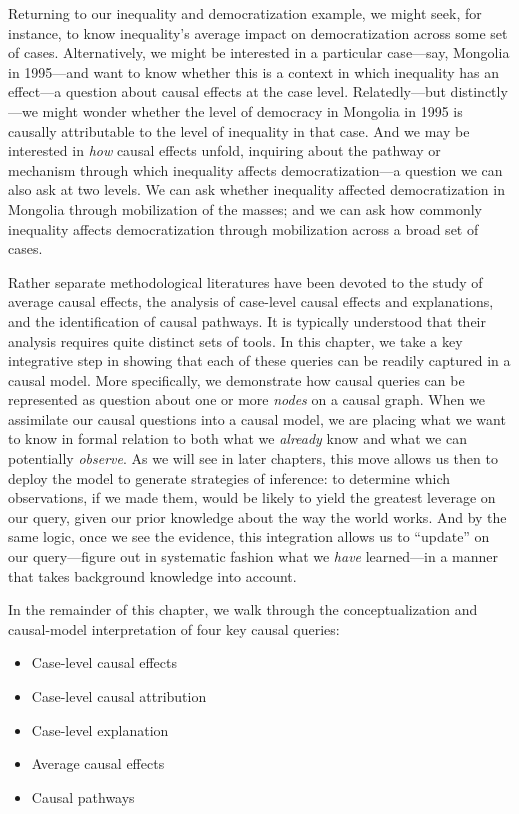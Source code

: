 \documentclass[12pt,]{book}
\begin{document}
Returning to our inequality and democratization example, we might seek, for instance, to know inequality's average impact on democratization across some set of cases. Alternatively, we might be interested in a particular case---say, Mongolia in 1995---and want to know whether this is a context in which inequality has an effect---a question about causal effects at the case level. Relatedly---but distinctly---we might wonder whether the level of democracy in Mongolia in 1995 is causally attributable to the level of inequality in that case. And we may be interested in \emph{how} causal effects unfold, inquiring about the pathway or mechanism through which inequality affects democratization---a question we can also ask at two levels. We can ask whether inequality affected democratization in Mongolia through mobilization of the masses; and we can ask how commonly inequality affects democratization through mobilization across a broad set of cases.

Rather separate methodological literatures have been devoted to the study of average causal effects, the analysis of case-level causal effects and explanations, and the identification of causal pathways. It is typically understood that their analysis requires quite distinct sets of tools. In this chapter, we take a key integrative step in showing that each of these queries can be readily captured in a causal model. More specifically, we demonstrate how causal queries can be represented as question about one or more \emph{nodes} on a causal graph. When we assimilate our causal questions into a causal model, we are placing what we want to know in formal relation to both what we \emph{already} know and what we can potentially \emph{observe}. As we will see in later chapters, this move allows us then to deploy the model to generate strategies of inference: to determine which observations, if we made them, would be likely to yield the greatest leverage on our query, given our prior knowledge about the way the world works. And by the same logic, once we see the evidence, this integration allows us to ``update'' on our query---figure out in systematic fashion what we \emph{have} learned---in a manner that takes background knowledge into account.

In the remainder of this chapter, we walk through the conceptualization and causal-model interpretation of four key causal queries:

\begin{itemize}
\item
  Case-level causal effects
\item
  Case-level causal attribution
\item
  Case-level explanation
\item
  Average causal effects
\item
  Causal pathways
\end{itemize}
\end{document}
